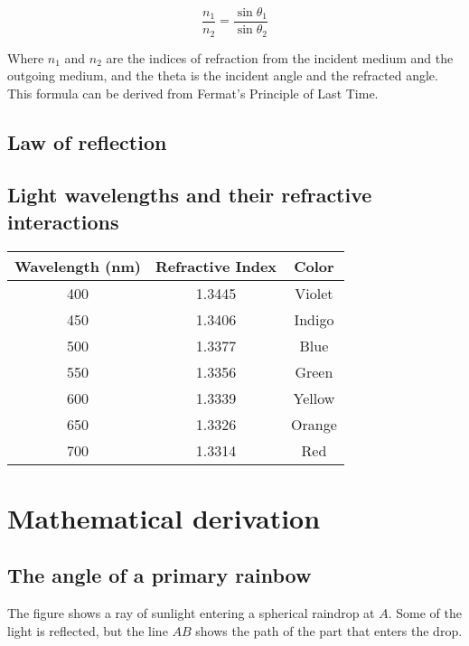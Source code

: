 \documentclass[a4paper,12pt]{article}
\begin{document}
\begin{equation} \label{refract}
\frac{n_1}{n_2} = \frac{\sin \theta_1}{\sin \theta_2}
\end{equation}

Where $n_1$ and $n_2$ are the indices of refraction from the incident medium and the outgoing medium, and the theta is the incident angle and the refracted angle. This formula can be derived from Fermat’s Principle of Last Time.


\subsection{Law of reflection}

\subsection{Light wavelengths and their refractive interactions}


\begin{table}[]
\centering
\def\arraystretch{1.5}
\begin{tabular}{|c|c|c|}
\hline
Wavelength (nm) & Refractive Index & Color  \\ \hline
400             & 1.3445           & Violet \\ \hline
450             & 1.3406           & Indigo \\ \hline
500             & 1.3377           & Blue   \\ \hline
550             & 1.3356           & Green  \\ \hline
600             & 1.3339           & Yellow \\ \hline
650             & 1.3326           & Orange \\ \hline
700             & 1.3314           & Red    \\ \hline
\end{tabular}
\end{table}


\section{Mathematical derivation}

\subsection{The angle of a primary rainbow}

The figure shows a ray of sunlight entering a spherical raindrop at $A$. Some of the light
is reflected, but the line $AB$ shows the path of the part that enters the drop. \\
\end{document}
